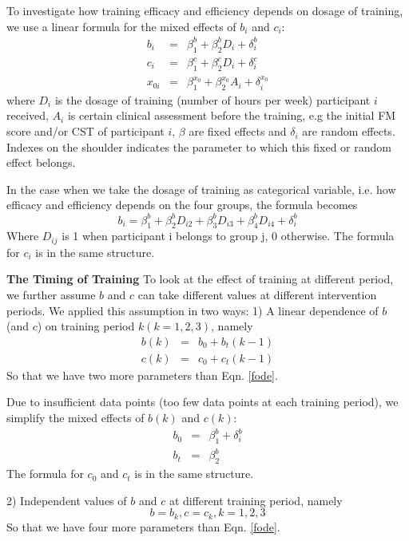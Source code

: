 {To investigate how training efficacy and efficiency depends on dosage of training, we use a linear formula for the mixed effects of $ b_i $ and $ c_i $:
\begin{eqnarray}\label{eqn:mixedeffect}
	b_i &=& \beta_1^b + \beta_2^b D_i + \delta_i^b   \nonumber \\
	c_i &=& \beta_1^c + \beta_2^c D_i + \delta_i^c   \\
	x_{0i} &=& \beta_1^{x_0} + \beta_2^{x_0} A_i + \delta_i^{x_0} \nonumber
\end{eqnarray}
where $ D_i $ is the dosage of training (number of hours per week) participant $ i $ received, 
$ A_i $ is certain clinical assessment before the training, e.g the initial FM score and/or CST of participant $ i $, 
$ \beta $ are fixed effects and $ \delta_i $ are random effects. 
Indexes on the shoulder indicates the parameter to which this fixed or random effect belongs.

In the case when we take the dosage of training as categorical variable, i.e. how efficacy and efficiency depends on the four groups, the formula becomes
\begin{equation}
	b_i = \beta_1^b + \beta_2^b D_{i2} + \beta_3^b D_{i3} + \beta_4^b D_{i4} + \delta_i^b
\end{equation}
Where $ D_{ij} $ is 1 when participant i belongs to group j, 0 otherwise. The formula for $ c_i $ is in the same structure.

\textbf{The Timing of Training}
To look at the effect of training at different period, we further assume $ b $ and $ c $ can take different values at different intervention periods. 
We applied this assumption in two ways: 1) A linear dependence of $ b $ (and $ c $) on training period $ k (k=1,2,3) $, namely
\begin{eqnarray}\label{eqn:timingcat}
	b(k) &=& b_0 + b_t (k-1) \nonumber  \\
	c(k) &=& c_0 + c_t (k-1)
\end{eqnarray}
So that we have two more parameters than Eqn. \ref{fode}. 

Due to insufficient data points (too few data points at each training period), we simplify the mixed effects of $ b(k) $ and $ c(k) $:
\begin{eqnarray}
	b_0 &=& \beta_1^b + \delta_i^b \\
	b_t &=& \beta_2^b
\end{eqnarray}
The formula for $ c_0 $ and $ c_t $ is in the same structure.

2) Independent values of $ b $ and $ c $ at different training period, namely
\begin{equation}
	b = b_k, c = c_k, k = 1,2,3
\end{equation}
So that we have four more parameters than Eqn. \ref{fode}. 

}
